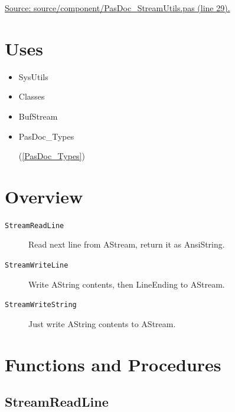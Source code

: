 \documentclass{report}
\newif\ifpdf
\begin{document}
   \par
\href{https://github.com/pasdoc/pasdoc/blob/master/source/component/PasDoc_StreamUtils.pas#L29}{Source: source/component/PasDoc{\_}StreamUtils.pas (line 29).}
\section{Uses}
\begin{itemize}
\item \begin{ttfamily}SysUtils\end{ttfamily}\item \begin{ttfamily}Classes\end{ttfamily}\item \begin{ttfamily}BufStream\end{ttfamily}\item \begin{ttfamily}PasDoc{\_}Types\end{ttfamily}(\ref{PasDoc_Types})\end{itemize}
\section{Overview}
\begin{description}
\item[\texttt{StreamReadLine}]Read next line from AStream, return it as AnsiString.
\item[\texttt{StreamWriteLine}]Write AString contents, then LineEnding to AStream.
\item[\texttt{StreamWriteString}]Just write AString contents to AStream.
\end{description}
\section{Functions and Procedures}
\ifpdf
\subsection*{\large{\textbf{StreamReadLine}}\normalsize\hspace{1ex}\hrulefill}
\else
\end{document}
